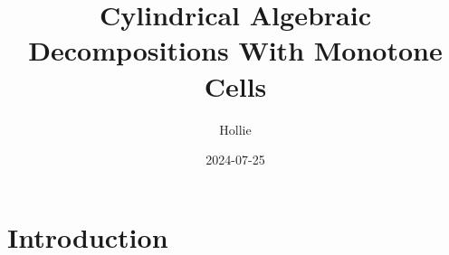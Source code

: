 \documentclass[
]{book}
\title{Cylindrical Algebraic Decompositions With Monotone Cells}
\author{Hollie}
\date{2024-07-25}
\theoremstyle{definition}
\theoremstyle{definition}
\theoremstyle{definition}
\theoremstyle{definition}
\theoremstyle{remark}
\begin{document}
\maketitle

{
\setcounter{tocdepth}{1}
\tableofcontents
}
\hypertarget{intro}{%
\chapter{Introduction}\label{intro}}

\newcommand{\R}{\mathbb{R}}
\newcommand{\Q}{\mathbb{Q}}
\newcommand{\N}{\mathbb{N}}
\newcommand{\Z}{\mathbb{Z}}
\newcommand{\A}{\mathbb{A}}

\newcommand{\sign}{\operatorname{sign}}
\newcommand{\proj}{\operatorname{proj}}
\newcommand{\lcm}{\operatorname{lcm}}
\newcommand{\lc}{\operatorname{lc}}
\newcommand{\lm}{\operatorname{lm}}
\newcommand{\ldt}{\operatorname{lt}}
\newcommand{\multideg}{\operatorname{multideg}}
\newcommand{\red}{\operatorname{red}}
\newcommand{\prim}{\operatorname{prim}}
\newcommand{\psrc}{\operatorname{psrc}}
\newcommand{\res}{\operatorname{Res}}
\newcommand{\lex}{<_{\rm{lex}}}
\newcommand{\lexeq}{\le_{\rm{lex}}}
\newcommand{\projop}[1]{{\proj_{\R^{#1}}}}

\newcommand{\projops}[1]{{\proj_{\opspan{#1}}}}
\newcommand{\opspan}[1]{{\operatorname{span} \{#1\}}}
\newcommand{\fr}[1]{{\operatorname{fr} \left( #1 \right)}}
\newcommand{\cl}[1]{{\operatorname{cl} \left( #1 \right)}}

\newcommand{\frt}{{\rm{fr}}}
\newcommand{\cls}{{\rm{cl}}}
\end{document}
